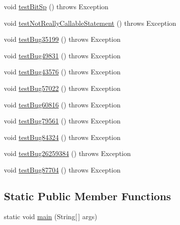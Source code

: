 \begin{DoxyCompactItemize}
void \mbox{\hyperlink{classtestsuite_1_1regression_1_1_callable_statement_regression_test_a62d50b9afe5d1c0ea97602443566a8b7}{test\+Bit\+Sp}} ()  throws Exception 
\item 
void \mbox{\hyperlink{classtestsuite_1_1regression_1_1_callable_statement_regression_test_a4ec3dd37af3e283e5fd49d2337ff02b3}{test\+Not\+Really\+Callable\+Statement}} ()  throws Exception 
\item 
void \mbox{\hyperlink{classtestsuite_1_1regression_1_1_callable_statement_regression_test_a179ee076f989c2634e8cd243f235985a}{test\+Bug35199}} ()  throws Exception 
\item 
void \mbox{\hyperlink{classtestsuite_1_1regression_1_1_callable_statement_regression_test_a80c90630b43a2beb90c1aca47ae09ea4}{test\+Bug49831}} ()  throws Exception 
\item 
void \mbox{\hyperlink{classtestsuite_1_1regression_1_1_callable_statement_regression_test_a354d9bdc0017ec0672d80b636718c136}{test\+Bug43576}} ()  throws Exception 
\item 
void \mbox{\hyperlink{classtestsuite_1_1regression_1_1_callable_statement_regression_test_a9d71a6ee60ddbf67fdc1efadaca6af56}{test\+Bug57022}} ()  throws Exception 
\item 
void \mbox{\hyperlink{classtestsuite_1_1regression_1_1_callable_statement_regression_test_adf4d392882f055ca081e7af6441af0e5}{test\+Bug60816}} ()  throws Exception 
\item 
void \mbox{\hyperlink{classtestsuite_1_1regression_1_1_callable_statement_regression_test_a0e24518b290873422733e33c74b12bcb}{test\+Bug79561}} ()  throws Exception 
\item 
void \mbox{\hyperlink{classtestsuite_1_1regression_1_1_callable_statement_regression_test_a7cc37b690fbb8450333631f6cd408c1d}{test\+Bug84324}} ()  throws Exception 
\item 
void \mbox{\hyperlink{classtestsuite_1_1regression_1_1_callable_statement_regression_test_afda6d8243580dfb952a9b9eeecaa4695}{test\+Bug26259384}} ()  throws Exception 
\item 
void \mbox{\hyperlink{classtestsuite_1_1regression_1_1_callable_statement_regression_test_a1c4d4988218d4f4e3cd1c7e5e84533d0}{test\+Bug87704}} ()  throws Exception 
\end{DoxyCompactItemize}
\subsection*{Static Public Member Functions}
\begin{DoxyCompactItemize}
\item 
static void \mbox{\hyperlink{classtestsuite_1_1regression_1_1_callable_statement_regression_test_a744e4dd9ffdc4244c736939bfe4c98a1}{main}} (String\mbox{[}$\,$\mbox{]} args)
\end{DoxyCompactItemize}
